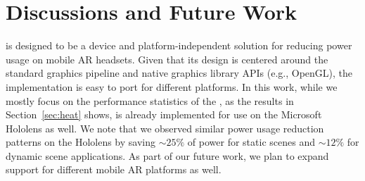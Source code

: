 \section{Discussions and Future Work}



%
{\myit} is designed to be a device and platform-independent solution for reducing power usage on mobile AR headsets. Given that its design is centered around the standard graphics pipeline and native graphics library APIs (e.g., OpenGL), the implementation is easy to port for different platforms. In this work, while we mostly focus on the performance statistics of the {\mlo}, as the results in Section~\ref{sec:heat} shows, {\myit} is already implemented for use on the Microsoft Hololens as well. We note that we observed similar power usage reduction patterns on the Hololens by saving $\sim25\%$ of power for static scenes and $\sim12\%$ for dynamic scene applications. As part of our future work, we plan to expand {\myit} support for different mobile AR platforms as well.



%


